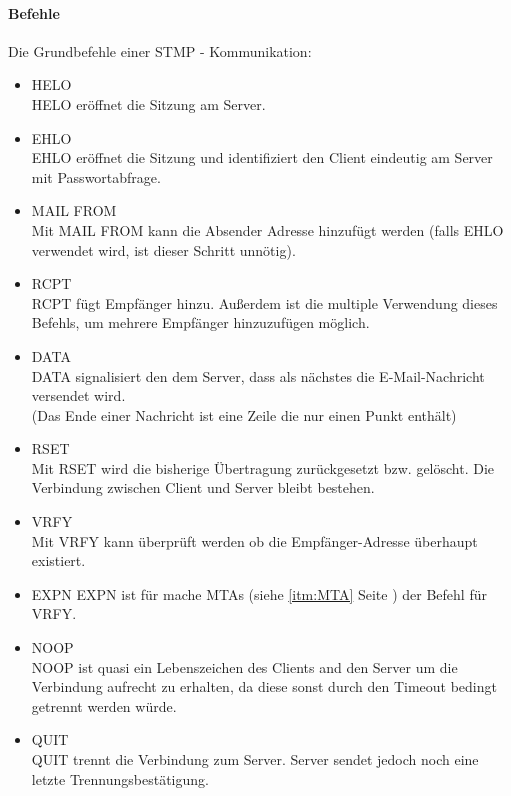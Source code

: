 \documentclass[12pt,a4paper]{report}
\begin{document}
\begin{onehalfspace}
\paragraph{Befehle\\}
Die Grundbefehle einer STMP - Kommunikation:
\begin{itemize}
\item HELO\\
HELO eröffnet die Sitzung am Server.
\item EHLO\\
EHLO eröffnet die Sitzung und identifiziert den Client eindeutig am Server mit Passwortabfrage.
\item MAIL FROM\\
Mit MAIL FROM kann die Absender Adresse hinzufügt werden (falls EHLO verwendet wird, ist dieser Schritt unnötig).
\item RCPT\\
RCPT fügt Empfänger hinzu. Außerdem ist die multiple Verwendung dieses Befehls, um mehrere Empfänger hinzuzufügen möglich.
\item DATA\\
DATA signalisiert den dem Server, dass als nächstes die E-Mail-Nachricht versendet wird. \\
(Das Ende einer Nachricht ist eine Zeile die nur einen Punkt enthält) 
\item RSET\\
Mit RSET wird die bisherige Übertragung zurückgesetzt bzw. gelöscht. Die Verbindung zwischen Client und Server bleibt bestehen.
\item VRFY\\
Mit VRFY kann überprüft werden ob die Empfänger-Adresse überhaupt existiert.
\item EXPN
EXPN ist für mache MTAs (siehe \ref{itm:MTA} Seite \pageref{itm:MTA}) der Befehl für VRFY.
\item NOOP\\
NOOP ist quasi ein Lebenszeichen des Clients and den Server um die Verbindung aufrecht zu erhalten, da diese sonst durch den Timeout bedingt getrennt werden würde.
\item QUIT\\
QUIT trennt die Verbindung zum Server. Server sendet jedoch noch eine letzte Trennungsbestätigung.
\end{itemize}


\end{onehalfspace}
\end{document}
